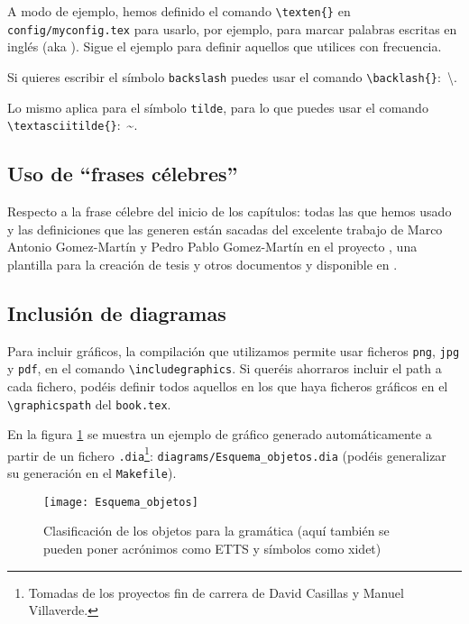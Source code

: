 A modo de ejemplo, hemos definido el comando
\texttt{\textbackslash{}texten\{\}} en \texttt{config/myconfig.tex} para
usarlo, por ejemplo, para marcar palabras escritas en inglés (aka
). Sigue el ejemplo para definir aquellos que utilices
con frecuencia.

Si quieres escribir el símbolo \texttt{backslash} puedes usar el comando
\texttt{\textbackslash{}backlash\{\}}:~\textbackslash{}.

Lo mismo aplica para el símbolo \texttt{tilde}, para lo que puedes usar
el comando \texttt{\textbackslash{}textasciitilde\{\}}:~\textasciitilde{}.


\subsection{Uso de ``frases célebres''}
\label{sec:uso-de-frases}

Respecto a la frase célebre del inicio de los capítulos: todas las que
hemos usado y las definiciones que las generen están sacadas del
excelente trabajo de Marco Antonio Gomez-Martín y Pedro Pablo
Gomez-Martín en el proyecto \texis, una plantilla para la creación de
tesis y otros documentos y disponible en \cite{texis}.


\subsection{Inclusión de diagramas}
\label{sec:diagrama}

Para incluir gráficos, la compilación que utilizamos permite usar
ficheros \texttt{png}, \texttt{jpg} y \texttt{pdf}, en el comando
\texttt{\textbackslash{}includegraphics}. Si queréis ahorraros incluir
el path a cada fichero, podéis definir todos aquellos en los que haya
ficheros gráficos en el \texttt{\textbackslash{}graphicspath} del
\texttt{book.tex}.

En la figura \ref{fig:fig_clobj} se muestra un ejemplo de gráfico
generado automáticamente a partir de un fichero
\texttt{.dia}\footnote{Tomadas de los proyectos fin de carrera de David
  Casillas y Manuel Villaverde.}: \texttt{diagrams/Esquema\_objetos.dia}
(podéis generalizar su generación en el \texttt{Makefile}).

\begin{figure}[tphb]
  \centering
  \texttt{[image: Esquema\_objetos]}
  \caption{Clasificación de los objetos para la gramática (aquí también
    se pueden poner acrónimos como \acs{ETTS} y símbolos como \ac{xidet})}
  \label{fig:fig_clobj}
\end{figure}


